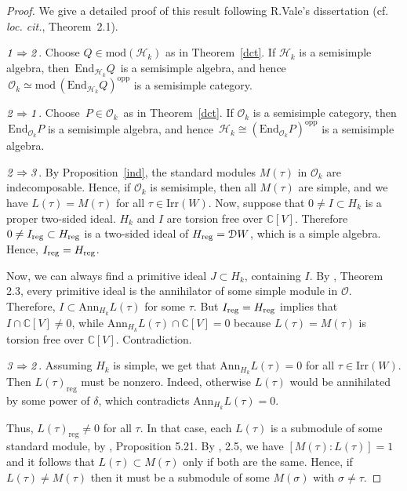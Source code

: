 \documentclass{amsart}
\theoremstyle{definition}
\theoremstyle{remark}
\numberwithin{equation}{section}
\begin{document}
\begin{proof} We give a detailed proof of this result following R.Vale's dissertation \cite{Va}
(cf. {\it loc. cit.}, Theorem~2.1).

${\it 1 \Rightarrow 2}$. Choose $ Q\in {\mathrm{mod}}({\mathcal{H}}_k) $ as in Theorem~\ref{dct}. If
${\mathcal{H}}_k $ is a semisimple algebra, then $\,{\mathrm{End}}_{{\mathcal{H}}_k}Q\,$ is a semisimple algebra, and hence $\, {\mathcal{O}}_k \simeq
{\mathrm{mod}}\,\left({\mathrm{End}}_{{\mathcal{H}}_k}Q\right)^{\mathrm{opp}} $ is a semisimple category.

${\it 2 \Rightarrow 1}$. Choose $\, P\in{\mathcal{O}}_k \,$ as in Theorem~\ref{dct}.
If $ {\mathcal{O}}_k $ is a semisimple category, then $\,{\mathrm{End}}_{{\mathcal{O}}_k}P $ is a semisimple algebra,
and hence $\,{\mathcal{H}}_k \cong \left({\mathrm{End}}_{{\mathcal{O}}_k}P\right)^{\mathrm{opp}}$ is a semisimple algebra.

${\it 2 \Rightarrow 3}$. By Proposition~\ref{ind}, the standard modules $ M(\tau) $
in ${\mathcal{O}}_k$ are indecomposable. Hence, if ${\mathcal{O}}_k$ is semisimple, then all $M(\tau)$ are
simple, and we have $ L(\tau)=M(\tau) $ for all $\tau\in{\mathrm{Irr}(W)}$. Now, suppose that $0\ne
I\subset H_k$ is a proper two-sided ideal. $H_k$ and $I$ are torsion
free over ${\mathbb{C}}[V]$. Therefore $0\ne {I_{\rm{reg}}}\subset{H_{\rm{reg}}}$ is a two-sided
ideal of ${H_{\rm{reg}}}={\mathcal{D}} W$, which is a simple algebra. Hence, ${I_{\rm{reg}}}={H_{\rm{reg}}}$.

Now, we can always find a primitive ideal $J\subset H_k$, containing
$I$.  By \cite{Gi}, Theorem 2.3, every primitive ideal is the
annihilator of some simple module in ${\mathcal{O}}$. Therefore,
$I\subset\mathrm{Ann}_{H_k}L(\tau)$ for some $\tau$. But
${I_{\rm{reg}}}={H_{\rm{reg}}}$ implies that $I\cap{\mathbb{C}}[V]\ne 0$, while
$\mathrm{Ann}_{H_k}L(\tau)\cap{\mathbb{C}}[V]=0$ because $L(\tau)=M(\tau)$ is
torsion free over ${\mathbb{C}}[V]$. Contradiction.

${\it 3 \Rightarrow 2}$.
Assuming $H_k$ is simple, we get that
$\mathrm{Ann}_{H_k}L(\tau)=0$ for all $\tau\in{\mathrm{Irr}(W)}$. Then
$L(\tau)_{\mathrm{reg}}$ must be nonzero. Indeed, otherwise
$L(\tau)$ would be annihilated by some power of $\delta$, which
contradicts $\mathrm{Ann}_{H_k}L(\tau)=0$.

Thus, $L(\tau)_{\mathrm{reg}}\ne 0$ for all $\tau$. In that case,
each $L(\tau)$ is a submodule of some standard module, by
\cite{GGOR}, Proposition 5.21. By \cite{DO}, 2.5, we have
$[M(\tau):L(\tau)]=1$ and it follows that $L(\tau)\subset M(\tau)$
only if both are the same. Hence, if $L(\tau)\ne M(\tau)$ then it
must be a submodule of some $M(\sigma)$ with $\sigma\ne\tau$.


\end{proof}
\end{document}

